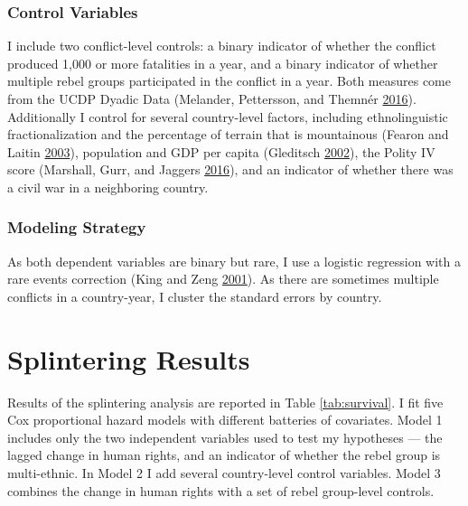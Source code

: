 \documentclass[12pt,]{book}
\theoremstyle{definition}
\theoremstyle{definition}
\theoremstyle{remark}
\begin{document}
\subsubsection*{Control Variables}\label{control-variables-1}

I include two conflict-level controls: a binary indicator of whether the
conflict produced 1,000 or more fatalities in a year, and a binary
indicator of whether multiple rebel groups participated in the conflict
in a year. Both measures come from the UCDP Dyadic Data (Melander,
Pettersson, and Themnér \protect\hyperlink{ref-Melander2016}{2016}).
Additionally I control for several country-level factors, including
ethnolinguistic fractionalization and the percentage of terrain that is
mountainous (Fearon and Laitin
\protect\hyperlink{ref-fearonlaitin03}{2003}), population and GDP per
capita (Gleditsch \protect\hyperlink{ref-Gleditsch2002b}{2002}), the
Polity IV score (Marshall, Gurr, and Jaggers
\protect\hyperlink{ref-Marshall2016}{2016}), and an indicator of whether
there was a civil war in a neighboring country.

\subsubsection*{Modeling Strategy}\label{modeling-strategy}

As both dependent variables are binary but rare, I use a logistic
regression with a rare events correction (King and Zeng
\protect\hyperlink{ref-King2001a}{2001}). As there are sometimes
multiple conflicts in a country-year, I cluster the standard errors by
country.

\section{Splintering Results}\label{splintering-results}

Results of the splintering analysis are reported in Table
\ref{tab:survival}. I fit five Cox proportional hazard models with
different batteries of covariates. Model 1 includes only the two
independent variables used to test my hypotheses --- the lagged change
in human rights, and an indicator of whether the rebel group is
multi-ethnic. In Model 2 I add several country-level control variables.
Model 3 combines the change in human rights with a set of rebel
group-level controls.
\end{document}
